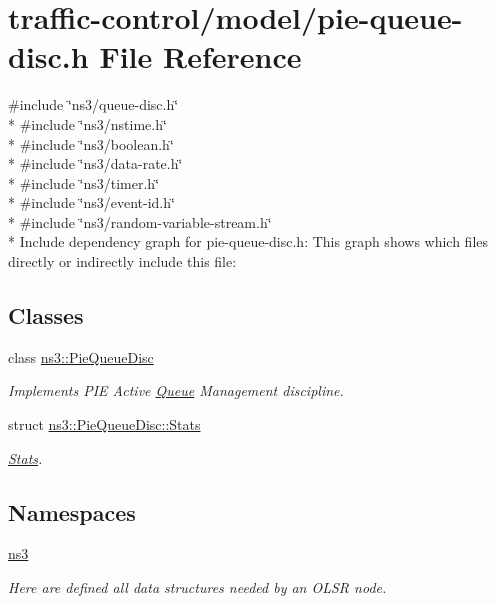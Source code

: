 \hypertarget{pie-queue-disc_8h}{}\section{traffic-\/control/model/pie-\/queue-\/disc.h File Reference}
\label{pie-queue-disc_8h}
{\ttfamily \#include \char`\"{}ns3/queue-\/disc.\+h\char`\"{}}\\*
{\ttfamily \#include \char`\"{}ns3/nstime.\+h\char`\"{}}\\*
{\ttfamily \#include \char`\"{}ns3/boolean.\+h\char`\"{}}\\*
{\ttfamily \#include \char`\"{}ns3/data-\/rate.\+h\char`\"{}}\\*
{\ttfamily \#include \char`\"{}ns3/timer.\+h\char`\"{}}\\*
{\ttfamily \#include \char`\"{}ns3/event-\/id.\+h\char`\"{}}\\*
{\ttfamily \#include \char`\"{}ns3/random-\/variable-\/stream.\+h\char`\"{}}\\*
Include dependency graph for pie-\/queue-\/disc.h\+:
This graph shows which files directly or indirectly include this file\+:
\subsection*{Classes}
\begin{DoxyCompactItemize}
\item 
class \hyperlink{classns3_1_1PieQueueDisc}{ns3\+::\+Pie\+Queue\+Disc}
\begin{DoxyCompactList}\small\item\em Implements P\+IE Active \hyperlink{classns3_1_1Queue}{Queue} Management discipline. \end{DoxyCompactList}\item 
struct \hyperlink{structns3_1_1PieQueueDisc_1_1Stats}{ns3\+::\+Pie\+Queue\+Disc\+::\+Stats}
\begin{DoxyCompactList}\small\item\em \hyperlink{structns3_1_1PieQueueDisc_1_1Stats}{Stats}. \end{DoxyCompactList}\end{DoxyCompactItemize}
\subsection*{Namespaces}
\begin{DoxyCompactItemize}
\item 
 \hyperlink{namespacens3}{ns3}
\begin{DoxyCompactList}\small\item\em Here are defined all data structures needed by an O\+L\+SR node. \end{DoxyCompactList}\end{DoxyCompactItemize}
